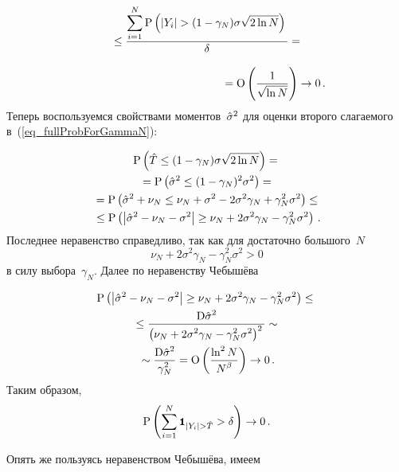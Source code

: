 \begin{multicols}{2}
\noindent
$${}\leq \fr{\sum\limits_{i=1}^{N}\prbblty\left(|Y_i|>(1-\gamma_N)\sigma\sqrt{2\ln N}\right)}{\delta}={}$$
\vspace*{-6pt}

\noindent
$$%
\hspace*{120pt}{}=\Obig\left(\fr{1}{\sqrt{\ln N}}\right)\rightarrow 0\,.
$$%
Теперь воспользуемся свойствами моментов~$\hat\sigma^2$ для оценки второго слагаемого в~(\ref{eq_fullProbForGammaN}):
\vspace*{-6pt}

\noindent
\begin{multline*}
\textrm{P}\left(\hat T\leq(1-\gamma_N)\sigma\sqrt{2\ln N}\right)={}\\
{}=
\textrm{P}\left(\hat\sigma^2\leq(1-\gamma_N)^2\sigma^2\right)={}\\
{}=\textrm{P}\left(\hat\sigma^2+\nu_N\leq\nu_N+\sigma^2-2\sigma^2\gamma_N+\gamma_N^2\sigma^2\right)\leq{}\\
{}\leq\textrm{P}\left(\left|\hat\sigma^2-\nu_N-\sigma^2\right|\geq\nu_N+2\sigma^2\gamma_N-\gamma_N^2\sigma^2\right)\,.
\end{multline*}
Последнее неравенство справедливо, так как для достаточно большого~$N$ 
$$
\nu_N+2\sigma^2\gamma_N-\gamma_N^2\sigma^2>0
$$ 
в силу выбора~$\gamma_N$. Далее по неравенству Чебышёва
\vspace*{-3pt}

\noindent
\begin{multline*}
\textrm{P}\left(\left|\hat\sigma^2-\nu_N-\sigma^2\right|\geq\nu_N+2\sigma^2\gamma_N-\gamma_N^2\sigma^2\right)\leq{}\\
{}\leq
\displaystyle\frac{\displaystyle \textrm{D}\hat\sigma^2\mathstrut}{\displaystyle \left(\nu_N+2\sigma^2\gamma_N-\gamma_N^2\sigma^2\right)^2\mathstrut}\sim{}\\
{}\sim\displaystyle\frac{\displaystyle \textrm{D}\hat\sigma^2\mathstrut}{\displaystyle \gamma_N^2\mathstrut}=\textrm{O}\left(\displaystyle\frac{\displaystyle \ln^2 N\mathstrut}{\displaystyle N^\beta\mathstrut}\right)\rightarrow 0\,.
\end{multline*}
Таким образом,
\begin{equation*}
\prbblty\left(\sum_{i=1}^{N}\indYighT>\delta\right)\rightarrow 0\,.
\end{equation*}

Опять же пользуясь неравенством Чебышёва, имеем
\vspace*{-6pt}


\end{multicols}
